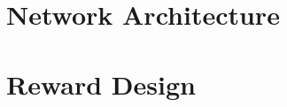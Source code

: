 \section{Network Architecture}\label{sec:network}

%
%

\section{Reward Design}\label{sec:task_reward}

%
